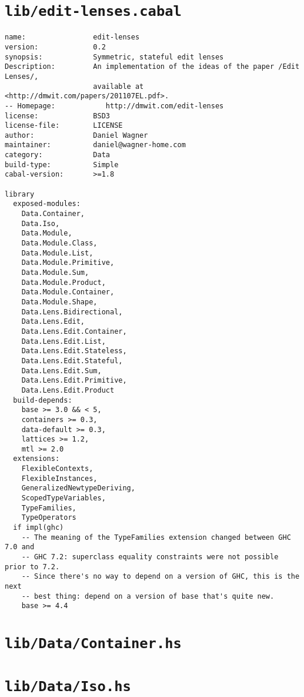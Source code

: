 \section{\texttt{lib/edit-lenses.cabal}}
\begin{verbatim}
name:                edit-lenses
version:             0.2
synopsis:            Symmetric, stateful edit lenses
Description:         An implementation of the ideas of the paper /Edit Lenses/,
                     available at <http://dmwit.com/papers/201107EL.pdf>.
-- Homepage:            http://dmwit.com/edit-lenses
license:             BSD3
license-file:        LICENSE
author:              Daniel Wagner
maintainer:          daniel@wagner-home.com
category:            Data
build-type:          Simple
cabal-version:       >=1.8

library
  exposed-modules:
    Data.Container,
    Data.Iso,
    Data.Module,
    Data.Module.Class,
    Data.Module.List,
    Data.Module.Primitive,
    Data.Module.Sum,
    Data.Module.Product,
    Data.Module.Container,
    Data.Module.Shape,
    Data.Lens.Bidirectional,
    Data.Lens.Edit,
    Data.Lens.Edit.Container,
    Data.Lens.Edit.List,
    Data.Lens.Edit.Stateless,
    Data.Lens.Edit.Stateful,
    Data.Lens.Edit.Sum,
    Data.Lens.Edit.Primitive,
    Data.Lens.Edit.Product
  build-depends:
    base >= 3.0 && < 5,
    containers >= 0.3,
    data-default >= 0.3,
    lattices >= 1.2,
    mtl >= 2.0
  extensions:
    FlexibleContexts,
    FlexibleInstances,
    GeneralizedNewtypeDeriving,
    ScopedTypeVariables,
    TypeFamilies,
    TypeOperators
  if impl(ghc)
    -- The meaning of the TypeFamilies extension changed between GHC 7.0 and
    -- GHC 7.2: superclass equality constraints were not possible prior to 7.2.
    -- Since there's no way to depend on a version of GHC, this is the next
    -- best thing: depend on a version of base that's quite new.
    base >= 4.4

\end{verbatim}

\section{\texttt{lib/Data/Container.hs}}
\label{mod:Data.Container}


\section{\texttt{lib/Data/Iso.hs}}
\label{mod:Data.Iso}



